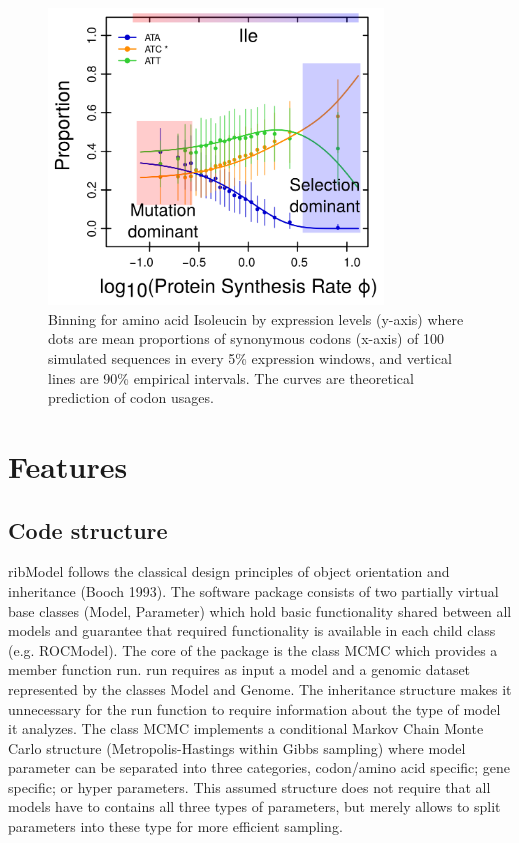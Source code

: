 \documentclass{bioinfo}
\begin{document}
\begin{figure}[!tpb]
\centering
 \includegraphics[width=3.5in]{expl_model.png}
\vspace{-0.2cm}
\caption{Binning for amino acid Isoleucin by expression levels (y-axis) where dots are mean proportions of synonymous codons (x-axis) of 100 simulated sequences in every 5\% expression windows, and vertical lines are 90\% empirical intervals. The curves are theoretical prediction of codon usages.
}
\label{fig:plotbin}
\end{figure}

\section{Features}
\subsection{Code structure}
ribModel follows the classical design principles of object orientation and inheritance (Booch 1993). 
The software package consists of two partially virtual base classes (Model, Parameter) which hold basic functionality shared between all models and guarantee that required functionality is available in each child class (e.g. ROCModel).
The core of the package is the class MCMC which provides a member function run. 
run requires as input a model and a genomic dataset represented by the classes Model and Genome. 
The inheritance structure makes it unnecessary for the run function to require information about the type of model it analyzes.
The class MCMC implements a conditional Markov Chain Monte Carlo structure (Metropolis-Hastings within Gibbs sampling) where model parameter can be separated into three categories, codon/amino acid specific; gene specific; or hyper parameters. 
This assumed structure does not require that all models have to contains all three types of parameters, but merely allows to split parameters into these type for more efficient sampling.
\end{document}
